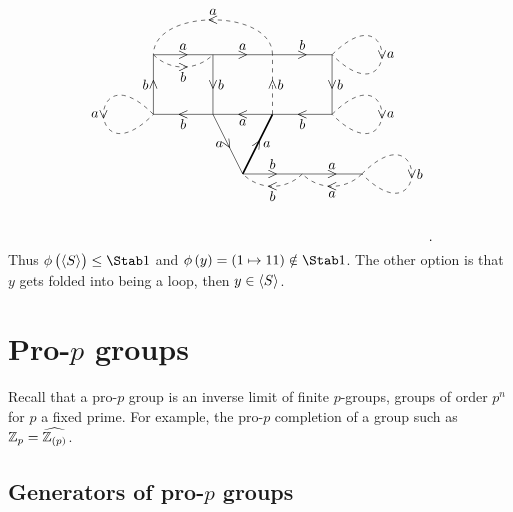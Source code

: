 \begin{example}
$$\begin{tikzpicture}[scale=1.5]
\draw (0, 0) to node{$ < $} node[below]{$ a $} (-1, 0);
\draw (-1, 0) to node{\rotatebox{30}{$ \vee $}} node[left]{$ a $} (-0.5, -1);
\draw [very thick] (-0.5, -1) to node{\rotatebox{60}{$ > $}} node[right]{$ a $} (0, 0);
\draw (-1, 0) to node{$ < $} node[below]{$ b $} (-2, 0);
\draw (-2, 0) to node{$ \wedge $} node[left]{$ b $} (-2, 1);
\draw (-2, 1) to node{$ > $} node[above]{$ a $} (-1, 1);
\draw (-1, 1) to node{$ \vee $} node[right]{$ b $} (-1, 0);
\draw (-1, 1) to node{$ > $} node[above]{$ a $} (0, 1);
\draw (0, 1) to node{$ > $} node[above]{$ b $} (1, 1);
\draw (1, 1) to node{$ \vee $} node[right]{$ b $} (1, 0);
\draw (1, 0) to node{$ < $} node[below]{$ b $} (0, 0);
\draw (-0.5, -1) to node{$ > $} node[above]{$ b $} (0.5, -1);
\draw (0.5, -1) to node{$ > $} node[above]{$ a $} (1.5, -1);
\draw [dashed] (0, 0) to node{$ \wedge $} node[right]{$ b $} (0, 1);
\draw [dashed] (-2, 1) to [in=-135, out=-45] node{$ > $} node[below]{$ b $} (-1, 1);
\draw [dashed] (0, 1) to [in=90, out=90] node{$ < $} node[above]{$ a $} (-2, 1);
\draw [dashed] (1, 1) to [in=-45, out=45, distance=45] node{$ \vee $} node[right]{$ a $} (1, 1);
\draw [dashed] (-2, 0) to [in=-135, out=135, distance=45] node{$ \vee $} node[left]{$ a $} (-2, 0);
\draw [dashed] (1, 0) to [in=-45, out=45, distance=45] node{$ \vee $} node[right]{$ a $} (1, 0);
\draw [dashed] (0.5, -1) to [in=-45, out=-135] node{$ < $} node[below]{$ b $} (-0.5, -1);
\draw [dashed] (1.5, -1) to [in=-45, out=-135] node{$ < $} node[below]{$ a $} (0.5, -1);
\draw [dashed] (1.5, -1) to [in=-45, out=45, distance=45] node{$ \vee $} node[right]{$ b $} (1.5, -1);
\end{tikzpicture}.
$$
Thus $ \phi\br{\abr{S}} \le \Stab 1 $ and $ \phi\br{y} = \br{1 \mapsto 11} \notin \Stab 1 $. The other option is that $ y $ gets folded into being a loop, then $ y \in \left\langle S \right\rangle $.
\end{example}

\pagebreak

\section{Pro-\texorpdfstring{$ p $}{p} groups}

Recall that a pro-$ p $ group is an inverse limit of finite $ p $-groups, groups of order $ p^n $ for $ p $ a fixed prime. For example, the pro-$ p $ completion of a group such as $ \ZZ_p = \widehat{\ZZ_{\br{p}}} $.

\subsection{Generators of pro-\texorpdfstring{$ p $}{p} groups}

